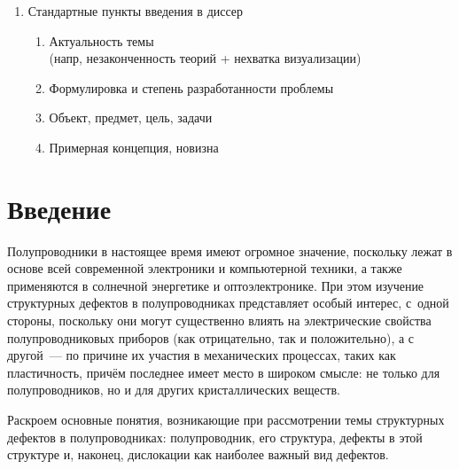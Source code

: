 \documentclass[a4paper, 14pt, titlepage]{extarticle}
\newcommand\sectiontoc[1]{\section*{\centering #1}\addcontentsline{toc}{section}{#1}}
\newcommand{\todo}[1]{\textbf{\textcolor{red}{TODO: #1}}}
\begin{document}
\begin{enumerate}
\begin{enumerate}
      \end{enumerate}
    \item Стандартные пункты введения в диссер
      \begin{enumerate}
        \item Актуальность темы\\ (напр, незаконченность теорий + нехватка визуализации)
        \item Формулировка и степень разработанности проблемы
        \item Объект, предмет, цель, задачи
        \item Примерная концепция, новизна
      \end{enumerate}
  \end{enumerate}




  \sectiontoc{Введение}\label{sec:intro}

  Полупроводники в настоящее время имеют огромное значение, поскольку лежат в основе всей
  современной электроники и компьютерной техники, а также применяются в солнечной энергетике и
  оптоэлектронике. При этом изучение структурных дефектов в полупроводниках представляет особый
  интерес, с~одной стороны, поскольку они могут существенно влиять на электрические свойства
  полупроводниковых приборов (как отрицательно, так и положительно), а с другой~--- по причине их
  участия в механических процессах, таких как пластичность, причём последнее имеет место в широком
  смысле: не только для полупроводников, но и для других кристаллических веществ.

  Раскроем основные понятия, возникающие при рассмотрении темы структурных дефектов в полупроводниках:
  полупроводник, его структура, дефекты в этой структуре и, наконец, дислокации как наиболее важный
  вид дефектов.
\end{document}
